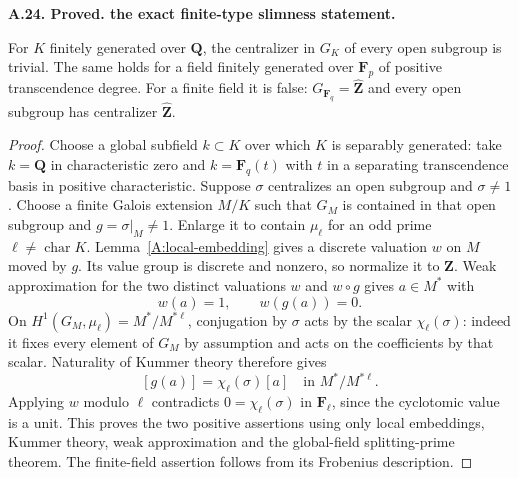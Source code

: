 \documentclass[11pt,oneside]{article}
\makeatletter
\newcounter{statementanchor}
\newenvironment{statement}[3]{%
 \refstepcounter{statementanchor}\def\@currentlabel{#1}%
 \par\addvspace{9pt}\noindent
 \textbf{#1. #2. #3.}\par\nobreak\noindent\ignorespaces
}{\par\addvspace{5pt}}
\makeatother
\begin{document}
\begin{statement}{A.24}{Proved}{the exact finite-type slimness statement}
\label{st:A.24}
\label{A:slim}
For $K$ finitely generated over $\mathbf Q$, the
centralizer in $G_K$ of every open subgroup is trivial.
The same holds for a field finitely generated over
$\mathbf F_p$ of positive transcendence degree.  For a
finite field it is false: $G_{\mathbf F_q}=\widehat{
\mathbf Z}$ and every open subgroup has centralizer
$\widehat{\mathbf Z}$.
\end{statement}
\begin{proof}
Choose a global subfield $k\subset K$ over which $K$
is separably generated: take $k=\mathbf Q$ in
characteristic zero and $k=\mathbf F_q(t)$ with $t$
in a separating transcendence basis in positive
characteristic.  Suppose $\sigma$ centralizes an open
subgroup and $\sigma\ne1$.  Choose a finite Galois
extension $M/K$ such that $G_M$ is contained in that
open subgroup and $g=\sigma|_M\ne1$.  Enlarge it to
contain $\mu_\ell$ for an odd prime $\ell\ne
\operatorname{char}K$.  Lemma~\ref{A:local-embedding}
gives a discrete valuation $w$ on $M$ moved by $g$.
Its value group is discrete and nonzero, so normalize
it to $\mathbf Z$.  Weak approximation for the two
distinct valuations $w$ and $w\circ g$ gives $a\in M^*$
with
\[
             w(a)=1,\qquad w(g(a))=0.
\]
On $H^1(G_M,\mu_\ell)=M^*/M^{*\ell}$, conjugation
by $\sigma$ acts by the scalar $\chi_\ell(\sigma)$:
indeed it fixes every element of $G_M$ by assumption
and acts on the coefficients by that scalar.  Naturality
of Kummer theory therefore gives
\[
       [g(a)]=\chi_\ell(\sigma)[a]
                   \quad\text{in }M^*/M^{*\ell}.
\]
Applying $w$ modulo $\ell$ contradicts $0=
\chi_\ell(\sigma)$ in $\mathbf F_\ell$, since the
cyclotomic value is a unit.  This proves the two
positive assertions using only local embeddings,
Kummer theory, weak approximation and the global-field
splitting-prime theorem.  The finite-field assertion
follows from its Frobenius description.
\end{proof}
\end{document}
